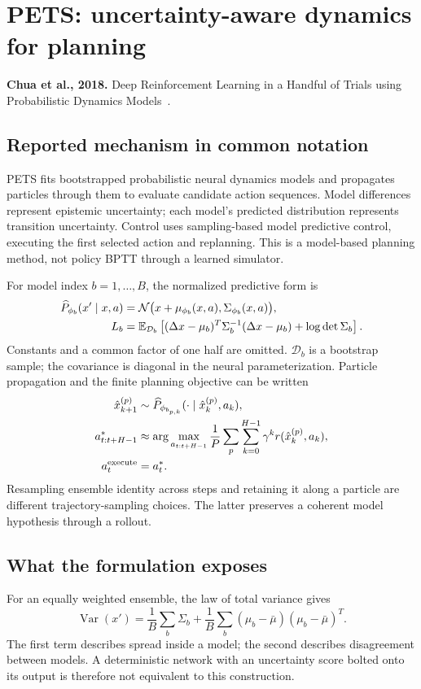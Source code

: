 \section{PETS: uncertainty-aware dynamics for planning}\label{sec:pets}
\textbf{Chua et al., 2018.} Deep Reinforcement Learning in a Handful of Trials
using Probabilistic Dynamics Models~\cite{pets}.

\subsection{Reported mechanism in common notation}
PETS fits bootstrapped probabilistic neural dynamics models and propagates
particles through them to evaluate candidate action sequences. Model differences
represent epistemic uncertainty; each model's predicted distribution represents
transition uncertainty. Control uses sampling-based model predictive control,
executing the first selected action and replanning. This is a model-based
planning method, not policy BPTT through a learned simulator.

For model index $b=1,\ldots,B$, the normalized predictive form is
\begin{align}
\widehat P_{\phi_b}(x'\mid x,a)&=\mathcal N\big(x+\mu_{\phi_b}(x,a),
\Sigma_{\phi_b}(x,a)\big),\\
L_b&=\mathbb E_{\mathcal D_b}\left[
(\Delta x-\mu_b)^T\Sigma_b^{-1}(\Delta x-\mu_b)+\log\det\Sigma_b\right].
\end{align}
Constants and a common factor of one half are omitted. $\mathcal D_b$ is a
bootstrap sample; the covariance is diagonal in the neural parameterization.
Particle propagation and the finite planning objective can be written
\begin{align}
\hat x_{k+1}^{(p)}&\sim\widehat P_{\phi_{b_{p,k}}}(\cdot\mid\hat x_k^{(p)},a_k),\\
a_{t:t+H-1}^{*}&\approx\arg\max_{a_{t:t+H-1}}
\frac1P\sum_p\sum_{k=0}^{H-1}\gamma^k r(\hat x_k^{(p)},a_k),\\
a_t^{\rm execute}&=a_t^*.
\end{align}
Resampling ensemble identity across steps and retaining it along a particle
are different trajectory-sampling choices. The latter preserves a coherent
model hypothesis through a rollout.

\subsection{What the formulation exposes}
For an equally weighted ensemble, the law of total variance gives
\begin{equation}\label{eq:ensemblevariance}
\operatorname{Var}(x')=\frac1B\sum_b\Sigma_b
+\frac1B\sum_b(\mu_b-\bar\mu)(\mu_b-\bar\mu)^T.
\end{equation}
The first term describes spread inside a model; the second describes disagreement
between models. A deterministic network with an uncertainty score bolted onto
its output is therefore not equivalent to this construction.

